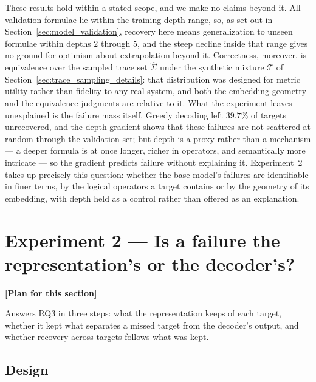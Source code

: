 \documentclass[titlepage,a4paper,11pt]{report}
\newenvironment{RSplan}{\par\medskip\color{orange!85!black}\noindent\textbf{[Plan for this section]}\par}{\par\medskip}
\begin{document}
    These results hold within a stated scope, and we make no claims beyond it. All validation formulae lie within the training depth range, so, as set out in Section~\ref{sec:model_validation}, recovery here means generalization to unseen formulae within depths $2$ through $5$, and the steep decline inside that range gives no ground for optimism about extrapolation beyond it. Correctness, moreover, is equivalence over the sampled trace set $\widehat\Sigma$ under the synthetic mixture $\mathcal{T}$ of Section~\ref{sec:trace_sampling_details}: that distribution was designed for metric utility rather than fidelity to any real system, and both the embedding geometry and the equivalence judgments are relative to it. What the experiment leaves unexplained is the failure mass itself. Greedy decoding left $39.7\%$ of targets unrecovered, and the depth gradient shows that these failures are not scattered at random through the validation set; but depth is a proxy rather than a mechanism --- a deeper formula is at once longer, richer in operators, and semantically more intricate --- so the gradient predicts failure without explaining it. Experiment~2 takes up precisely this question: whether the base model's failures are identifiable in finer terms, by the logical operators a target contains or by the geometry of its embedding, with depth held as a control rather than offered as an explanation.

    

    \section{Experiment 2 --- Is a failure the representation's or the decoder's?}\label{sec:exp_diagnosis}
    \begin{RSplan}
    Answers RQ3 in three steps: what the representation keeps of each target, whether it kept what separates a missed target from the decoder's output, and whether recovery across targets follows what was kept.
    \end{RSplan}

    \subsection{Design}\label{sec:diag_design}
\end{document}
